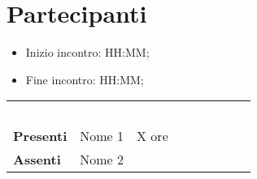 \section{Partecipanti}

\begin{itemize}
    \item Inizio incontro: HH:MM;
    \item Fine incontro: HH:MM;
\end{itemize}


\begin{center}
{\renewcommand{\arraystretch}{1.5}
\begin{tabular}{lll}
	\rowcolor[RGB]{125, 1, 158}
	                    & \textcolor{white}{\textbf{Nome}}  & \textcolor{white}{\textbf{Durata presenza}} \\
	\rowcolor[RGB]{207, 159, 255}
	\textbf{Presenti}   & Nome 1            & X ore     \\
	\rowcolor[RGB]{234, 213, 255}
	\textbf{Assenti}	& Nome 2            &      		\\
\end{tabular}	
}
\end{center}